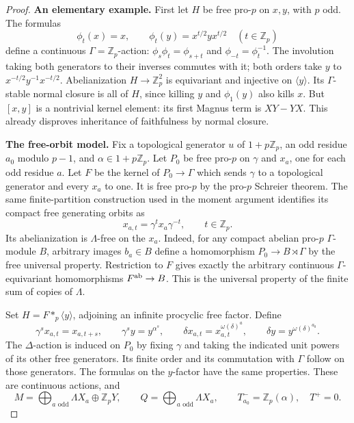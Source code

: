 \begin{proof}
\par\medskip\noindent\textbf{An elementary example.}
First let \(H\) be free pro-\(p\) on \(x,y\), with \(p\) odd.
The formulas
\[
 \phi_t(x)=x,\qquad \phi_t(y)=x^{t/2}y x^{t/2}
 \quad(t\in\mathbb Z_p)
\]
define a continuous \(\Gamma=\mathbb Z_p\)-action:
\(\phi_s\phi_t=\phi_{s+t}\) and \(\phi_{-t}=\phi_t^{-1}\).
The involution taking both generators to their inverses commutes
with it; both orders take \(y\) to
\(x^{-t/2}y^{-1}x^{-t/2}\). Abelianization
\(H\to\mathbb Z_p^2\) is equivariant and injective on
\(\langle y\rangle\). Its \(\Gamma\)-stable normal closure is
all of \(H\), since killing \(y\) and \(\phi_1(y)\) also kills
\(x\). But \([x,y]\) is a nontrivial kernel element: its first
Magnus term is \(XY-YX\). This already disproves inheritance of
faithfulness by normal closure.

\par\medskip\noindent\textbf{The free-orbit model.}
Fix a topological generator \(u\) of \(1+p\mathbb Z_p\), an
odd residue \(a_0\) modulo \(p-1\), and
\(\alpha\in1+p\mathbb Z_p\). Let \(P_0\) be free pro-\(p\)
on \(\gamma\) and \(x_a\), one for each odd residue \(a\).
Let \(F\) be the kernel of \(P_0\to\Gamma\) which sends
\(\gamma\) to a topological generator and every \(x_a\) to one.
It is free pro-\(p\) by the pro-\(p\) Schreier theorem. The same
finite-partition construction used in the moment argument identifies
its compact free generating orbits as
\[
 x_{a,t}=\gamma^t x_a\gamma^{-t},\qquad t\in\mathbb Z_p.
\]
Its abelianization is \(\Lambda\)-free on the \(x_a\).
Indeed, for any compact abelian pro-\(p\) \(\Gamma\)-module \(B\), arbitrary
images \(b_a\in B\) define a homomorphism
\(P_0\to B\rtimes\Gamma\) by the free universal property.
Restriction to \(F\) gives exactly the arbitrary continuous
\(\Gamma\)-equivariant homomorphisms \(F^{\rm ab}\to B\).
This is the universal property of the finite sum of copies of
\(\Lambda\).

Set \(H=F*_p\langle y\rangle\), adjoining an infinite procyclic
free factor. Define
\[
 \gamma^s x_{a,t}=x_{a,t+s},\qquad
 \gamma^s y=y^{\alpha^s},
 \qquad
 \delta x_{a,t}=x_{a,t}^{\omega(\delta)^a},\qquad
 \delta y=y^{\omega(\delta)^{a_0}}.
 \tag{GN.5}
\]
The \(\Delta\)-action is induced on \(P_0\) by fixing
\(\gamma\) and taking the indicated unit powers of its other free
generators. Its finite order and its commutation with \(\Gamma\)
follow on those generators. The formulas on the \(y\)-factor have
the same properties. These are continuous actions, and
\[
 M=\bigoplus_{a\text{ odd}}\Lambda X_a\oplus\mathbb Z_pY,
 \qquad Q=\bigoplus_{a\text{ odd}}\Lambda X_a,
 \qquad T^-_{a_0}=\mathbb Z_p(\alpha),\quad T^+=0.
 \tag{GN.6}
\]


\end{proof}
